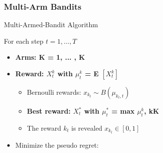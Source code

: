 \subsubsection{Multi-Arm Bandits}
\begin{frame}{Multi-Armed-Bandit Algorithm}{}



 For each step $t=1, \dots, T$
\begin{itemize}
	\item \bf{Arms:} K = {1, ... , K}
	\item \bf{Reward:} $X^{k}_{t}$ with $\mu^{k}_{t}$ = E $[X^{k}_{t}]$
	\begin{itemize}
		\item Bernoulli rewards: $x_{k_{t}} \sim B\left(\mu_{k_{t}, t}\right)$
		\item \bf{Best reward:} $X^{*}_{t}$ with $\mu^{*}_{t}$ = max $\mu^{k}_{t}$,  k\in  K
		\item The reward $k_{t}$ is revealed $x_{k_{t}} \in[0,1]$
	\end{itemize}
\item  Minimize the pseudo regret:
\end{itemize}

\end{frame}

